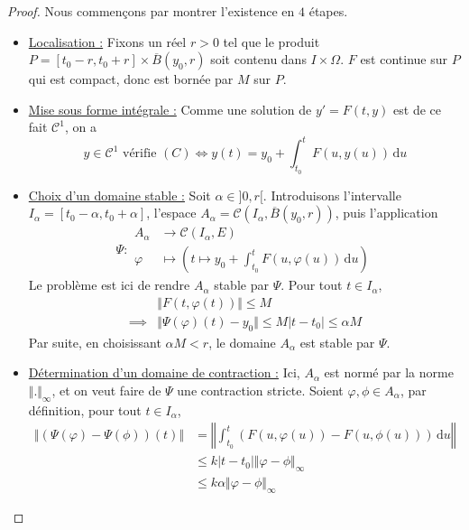   \begin{proof}
    Nous commençons par montrer l'existence en $4$ étapes.
    \begin{itemize}
      \item \uline{Localisation :} Fixons un réel $r > 0$ tel que le produit $P = [t_0 - r, t_0 + r] \times \overline{B}(y_0, r)$ soit contenu dans $I \times \Omega$. $F$ est continue sur $P$ qui est compact, donc est bornée par $M$ sur $P$.
      \item \uline{Mise sous forme intégrale :} Comme une solution de $y' = F(t, y)$ est de ce fait $\mathcal{C}^1$, on a
      \[ y \in \mathcal{C}^1 \text{ vérifie } (C) \iff y(t) = y_0 + \int_{t_0}^t F(u, y(u)) \, \mathrm{d}u \tag{$*$} \]
      \item \uline{Choix d'un domaine stable :} Soit $\alpha \in ]0, r[$. Introduisons l'intervalle $I_\alpha = [t_0 - \alpha, t_0 + \alpha]$, l'espace $A_\alpha = \mathcal{C}(I_\alpha, \overline{B}(y_0, r))$, puis l'application
      \[
      \Psi :
      \begin{array}{ll}
        A_\alpha &\rightarrow \mathcal{C}(I_\alpha, E)  \\
        \varphi &\mapsto \left(t \mapsto y_0 + \int_{t_0}^t F(u, \varphi(u)) \, \mathrm{d}u \right)
      \end{array}
      \]
      Le problème est ici de rendre $A_\alpha$ stable par $\Psi$. Pour tout $t \in I_\alpha$,
      \begin{align*}
        &\Vert F(t, \varphi(t)) \Vert \leq M \\
        \implies& \Vert \Psi(\varphi)(t) - y_0 \Vert \leq M |t-t_0| \leq \alpha M
      \end{align*}
      Par suite, en choisissant $\alpha M < r$, le domaine $A_\alpha$ est stable par $\Psi$.
      \item \uline{Détermination d'un domaine de contraction :} Ici, $A_\alpha$ est normé par la norme $\Vert . \Vert_{\infty}$, et on veut faire de $\Psi$ une contraction stricte. Soient $\varphi, \phi \in A_\alpha$, par définition, pour tout $t \in I_\alpha$,
      \begin{align*}
        \Vert (\Psi(\varphi) - \Psi(\phi)) (t) \Vert &= \left \Vert \int_{t_0}^t (F(u, \varphi(u)) - F(u, \phi(u))) \, \mathrm{d}u \right \Vert \\
        &\leq k |t-t_0| \Vert \varphi - \phi \Vert_\infty \\
        &\leq k \alpha \Vert \varphi - \phi \Vert_\infty
      \end{align*}

\end{itemize}
\end{proof}
